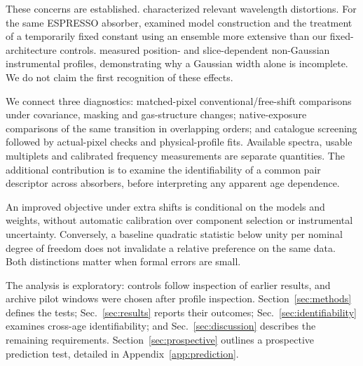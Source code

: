 \documentclass[11pt,a4paper]{article}
\begin{document}
These concerns are established. \citet{WhitmoreMurphy2015} characterized relevant wavelength distortions. For the same ESPRESSO absorber, \citet{Lee2023Models} examined model construction and the treatment of a temporarily fixed constant using an ensemble more extensive than our fixed-architecture controls. \citet{Schmidt2024LSF} measured position- and slice-dependent non-Gaussian instrumental profiles, demonstrating why a Gaussian width alone is incomplete. We do not claim the first recognition of these effects.

We connect three diagnostics: matched-pixel conventional/free-shift comparisons under covariance, masking and gas-structure changes; native-exposure comparisons of the same transition in overlapping orders; and catalogue screening followed by actual-pixel checks and physical-profile fits. Available spectra, usable multiplets and calibrated frequency measurements are separate quantities. The additional contribution is to examine the identifiability of a common pair descriptor across absorbers, before interpreting any apparent age dependence.

An improved objective under extra shifts is conditional on the models and weights, without automatic calibration over component selection or instrumental uncertainty. Conversely, a baseline quadratic statistic below unity per nominal degree of freedom does not invalidate a relative preference on the same data. Both distinctions matter when formal errors are small.

The analysis is exploratory: controls follow inspection of earlier results, and archive pilot windows were chosen after profile inspection. Section~\ref{sec:methods} defines the tests; Sec.~\ref{sec:results} reports their outcomes; Sec.~\ref{sec:identifiability} examines cross-age identifiability; and Sec.~\ref{sec:discussion} describes the remaining requirements. Section~\ref{sec:prospective} outlines a prospective prediction test, detailed in Appendix~\ref{app:prediction}.




\end{document}
